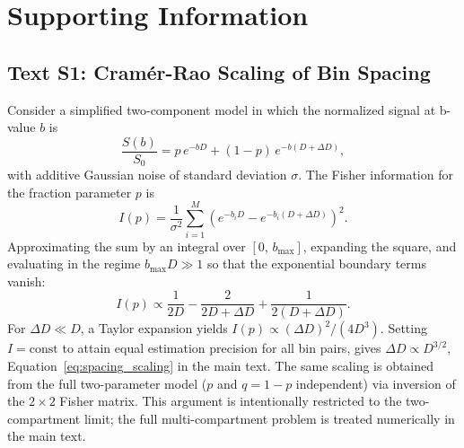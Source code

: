 %
%

\section*{Supporting Information}

\subsection*{Text S1: Cram\'er-Rao Scaling of Bin Spacing}

Consider a simplified two-component model in which the normalized signal at
b-value $b$ is
%
\begin{equation*}
  \frac{S(b)}{S_0} = p\,e^{-bD} + (1-p)\,e^{-b(D+\Delta D)},
\end{equation*}
%
with additive Gaussian noise of standard deviation $\sigma$.
The Fisher information for the fraction parameter $p$ is
%
\begin{equation*}
  I(p) = \frac{1}{\sigma^2}\sum_{i=1}^{M}\left(e^{-b_i D} - e^{-b_i(D+\Delta D)}\right)^2.
\end{equation*}
%
Approximating the sum by an integral over $[0,\,b_{\max}]$, expanding the
square, and evaluating in the regime $b_{\max} D \gg 1$ so that the
exponential boundary terms vanish:
%
\begin{equation*}
  I(p) \propto \frac{1}{2D} - \frac{2}{2D + \Delta D} + \frac{1}{2(D + \Delta D)}.
\end{equation*}
%
For $\Delta D \ll D$, a Taylor expansion yields
$I(p) \propto (\Delta D)^2 / (4D^3)$.
Setting $I = \text{const}$ to attain equal estimation precision for all bin pairs,
gives $\Delta D \propto D^{3/2}$, Equation~\ref{eq:spacing_scaling} in the
main text.
The same scaling is obtained from the full two-parameter model ($p$ and
$q = 1-p$ independent) via inversion of the $2 \times 2$ Fisher matrix.
This argument is intentionally restricted to the two-compartment limit; the
full multi-compartment problem is treated numerically in the main text.

